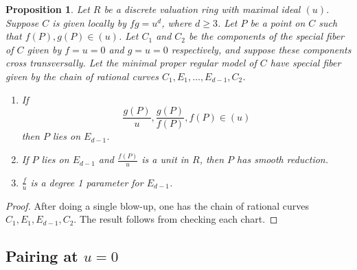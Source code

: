 \documentclass[pagesize,paper=letter]{scrartcl}
\newtheorem{proposition}[thm]{Proposition}
\theoremstyle{definition}
\theoremstyle{remark}
\begin{document}
\begin{proposition}\label{prop:fg-equals-u-blow-up}
  Let $R$ be a discrete valuation ring with maximal ideal $(u)$. Suppose $C$ is given locally by $fg = u^d$, where $d \geq 3$. Let $P$ be a point on $C$ such that $f(P), g(P) \in (u)$. Let $C_1$ and $C_2$ be the components of the special fiber of $C$ given by $f = u = 0$ and $g = u = 0$ respectively, and suppose these components cross transversally. Let the minimal proper regular model of $C$ have special fiber given by the chain of rational curves $C_1, E_1, \dots, E_{d-1}, C_2$.
  \begin{enumerate}
      \item  If
  \[
  \frac{g(P)}{u}, \frac{g(P)}{f(P)}, f(P) \in (u)
  \]
  then $P$ lies on $E_{d-1}$.
    \item If $P$ lies on $E_{d-1}$ and $\frac{f(P)}{u}$ is a unit in $R$, then $P$ has smooth reduction.
    \item $\frac{f}{u}$ is a degree 1 parameter for $E_{d-1}$.
  \end{enumerate}
\end{proposition}

\begin{proof}
  After doing a single blow-up, one has the chain of rational curves $C_1, E_1, E_{d-1}, C_2$. The result follows from checking each chart.
\end{proof}

\subsection{Pairing at $u = 0$}
\label{sec:pairing-at-u}
\end{document}
